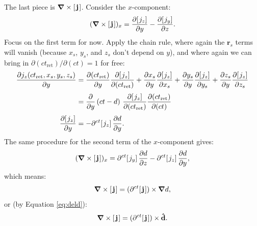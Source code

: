 \documentclass[12pt]{article}
\renewcommand{\vv}[1]{\mathbf{#1}}
\newcommand{\del}{\boldsymbol{\nabla}}
\begin{document}
The last piece is $\del \times [\mkern2mu \vv j \mkern1.5mu ]$. Consider the $x$-component:
\begin{equation*}
(\del \times [\mkern2mu \vv j \mkern1.5mu ])_x = \dfrac{\partial [\mkern1.5mu j_z]}{\partial y} - \dfrac{\partial [\mkern1.5mu j_y]}{\partial z} .
\end{equation*}
Focus on the first term for now. Apply the chain rule, where again the $\vv r_{s}$ terms will vanish (because $x_s$, $y_s$, and $z_s$ don't depend on $y$), and where again we can bring in $\partial(ct_{\mathrm{ret}})/\partial(ct) = 1$ for free:
\begin{equation*}
\begin{aligned}
\dfrac{\partial j_z (ct_{\mathrm{ret}}, x_{s}, y_{s}, z_{s})}{\partial y} &= \dfrac{\partial (ct_{\mathrm{ret}})}{\partial y} \dfrac{\partial  [\mkern1.5mu j_z]}{\partial (ct_{\mathrm{ret}})} + \dfrac{\partial x_{s}}{\partial y} \dfrac{\partial  [\mkern1.5mu j_z]}{\partial x_{s}} + \dfrac{\partial y_{s}}{\partial y} \dfrac{\partial  [\mkern1.5mu j_z]}{\partial y_{s}} + \dfrac{\partial z_{s}}{\partial y} \dfrac{\partial  [\mkern1.5mu j_z]}{\partial z_{s}} \\[3pt]
&= \dfrac{\partial }{\partial y} \left( ct - d \right) \, \dfrac{\partial  [\mkern1.5mu j_z]}{\partial (ct_{\mathrm{ret}})} \dfrac{\partial (ct_{\mathrm{ret}})}{\partial (ct)} \\[3pt]
\dfrac{\partial [\mkern1.5mu j_z]}{\partial y} &= - \partial^{ct}  [\mkern1.5mu j_z] \, \dfrac{\partial d}{\partial y} .
\end{aligned}
\end{equation*}
The same procedure for the second term of the $x$-component gives:
\begin{equation*}
(\del \times [\mkern2mu \vv j \mkern1.5mu ])_x = \partial^{ct}  [\mkern1.5mu j_y] \, \dfrac{\partial d}{\partial z} - \partial^{ct}  [\mkern1.5mu j_z] \, \dfrac{\partial d}{\partial y} ,
\end{equation*}
which means:
\begin{equation*}
\del \times [\mkern2mu \vv j \mkern1.5mu ] = (\partial^{ct} [\mkern2mu \vv j \mkern1.5mu ]) \times \del d ,
\end{equation*}
or (by Equation \ref{eq:deld}):
\begin{equation}\label{eq:curlj}
\del \times [\mkern2mu \vv j \mkern1.5mu ] = (\partial^{ct} [\mkern2mu \vv j \mkern1.5mu ]) \times \vv{\hat{d}} .
\end{equation}
\end{document}
